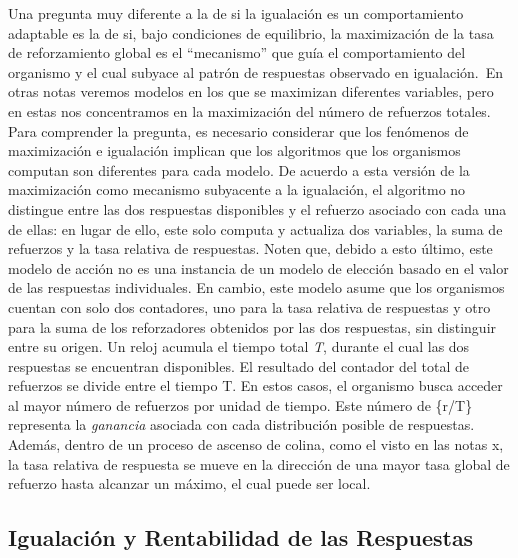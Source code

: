 \documentclass[
  letterpaper,
]{book}
\begin{document}
Una pregunta muy diferente a la de si la igualación es un comportamiento
adaptable es la de si, bajo condiciones de equilibrio, la maximización
de la tasa de reforzamiento global es el ``mecanismo'' que guía el
comportamiento del organismo y el cual subyace al patrón de respuestas
observado en igualación.~En otras notas veremos modelos en los que se
maximizan diferentes variables, pero en estas nos concentramos en la
maximización del número de refuerzos totales. Para comprender la
pregunta, es necesario considerar que los fenómenos de maximización e
igualación implican que los algoritmos que los organismos computan son
diferentes para cada modelo. De acuerdo a esta versión de la
maximización como mecanismo subyacente a la igualación, el algoritmo no
distingue entre las dos respuestas disponibles y el refuerzo asociado
con cada una de ellas: en lugar de ello, este solo computa y actualiza
dos variables, la suma de refuerzos y la tasa relativa de respuestas.
Noten que, debido a esto último, este modelo de acción no es una
instancia de un modelo de elección basado en el valor de las respuestas
individuales. En cambio, este modelo asume que los organismos cuentan
con solo dos contadores, uno para la tasa relativa de respuestas y otro
para la suma de los reforzadores obtenidos por las dos respuestas, sin
distinguir entre su origen. Un reloj acumula el tiempo total \emph{T},
durante el cual las dos respuestas se encuentran disponibles. El
resultado del contador del total de refuerzos se divide entre el tiempo
T. En estos casos, el organismo busca acceder al mayor número de
refuerzos por unidad de tiempo. Este número de \{r/T\} representa la
\emph{ganancia} asociada con cada distribución posible de respuestas.
Además, dentro de un proceso de ascenso de colina, como el visto en las
notas x, la tasa relativa de respuesta se mueve en la dirección de una
mayor tasa global de refuerzo hasta alcanzar un máximo, el cual puede
ser local.

\subsection{Igualación y Rentabilidad de las
Respuestas}\label{igualaciuxf3n-y-rentabilidad-de-las-respuestas}
\end{document}
